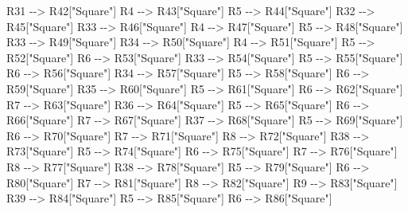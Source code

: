 \documentclass[
]{article}
\newenvironment{Shaded}{}{}
\newcommand{\NormalTok}[1]{#1}
\begin{document}
\begin{Shaded}
\begin{Highlighting}[]
\NormalTok{        R31 {-}{-}\textgreater{} R42["Square"]}
\NormalTok{        R4 {-}{-}\textgreater{} R43["Square"]}
\NormalTok{        R5 {-}{-}\textgreater{} R44["Square"]}
\NormalTok{        R32 {-}{-}\textgreater{} R45["Square"]}
\NormalTok{        R33 {-}{-}\textgreater{} R46["Square"]}
\NormalTok{        R4 {-}{-}\textgreater{} R47["Square"]}
\NormalTok{        R5 {-}{-}\textgreater{} R48["Square"]}
\NormalTok{        R33 {-}{-}\textgreater{} R49["Square"]}
\NormalTok{        R34 {-}{-}\textgreater{} R50["Square"]}
\NormalTok{        R4 {-}{-}\textgreater{} R51["Square"]}
\NormalTok{        R5 {-}{-}\textgreater{} R52["Square"]}
\NormalTok{        R6 {-}{-}\textgreater{} R53["Square"]}
\NormalTok{        R33 {-}{-}\textgreater{} R54["Square"]}
\NormalTok{        R5 {-}{-}\textgreater{} R55["Square"]}
\NormalTok{        R6 {-}{-}\textgreater{} R56["Square"]}
\NormalTok{        R34 {-}{-}\textgreater{} R57["Square"]}
\NormalTok{        R5 {-}{-}\textgreater{} R58["Square"]}
\NormalTok{        R6 {-}{-}\textgreater{} R59["Square"]}
\NormalTok{        R35 {-}{-}\textgreater{} R60["Square"]}
\NormalTok{        R5 {-}{-}\textgreater{} R61["Square"]}
\NormalTok{        R6 {-}{-}\textgreater{} R62["Square"]}
\NormalTok{        R7 {-}{-}\textgreater{} R63["Square"]}
\NormalTok{        R36 {-}{-}\textgreater{} R64["Square"]}
\NormalTok{        R5 {-}{-}\textgreater{} R65["Square"]}
\NormalTok{        R6 {-}{-}\textgreater{} R66["Square"]}
\NormalTok{        R7 {-}{-}\textgreater{} R67["Square"]}
\NormalTok{        R37 {-}{-}\textgreater{} R68["Square"]}
\NormalTok{        R5 {-}{-}\textgreater{} R69["Square"]}
\NormalTok{        R6 {-}{-}\textgreater{} R70["Square"]}
\NormalTok{        R7 {-}{-}\textgreater{} R71["Square"]}
\NormalTok{        R8 {-}{-}\textgreater{} R72["Square"]}
\NormalTok{        R38 {-}{-}\textgreater{} R73["Square"]}
\NormalTok{        R5 {-}{-}\textgreater{} R74["Square"]}
\NormalTok{        R6 {-}{-}\textgreater{} R75["Square"]}
\NormalTok{        R7 {-}{-}\textgreater{} R76["Square"]}
\NormalTok{        R8 {-}{-}\textgreater{} R77["Square"]}
\NormalTok{        R38 {-}{-}\textgreater{} R78["Square"]}
\NormalTok{        R5 {-}{-}\textgreater{} R79["Square"]}
\NormalTok{        R6 {-}{-}\textgreater{} R80["Square"]}
\NormalTok{        R7 {-}{-}\textgreater{} R81["Square"]}
\NormalTok{        R8 {-}{-}\textgreater{} R82["Square"]}
\NormalTok{        R9 {-}{-}\textgreater{} R83["Square"]}
\NormalTok{        R39 {-}{-}\textgreater{} R84["Square"]}
\NormalTok{        R5 {-}{-}\textgreater{} R85["Square"]}
\NormalTok{        R6 {-}{-}\textgreater{} R86["Square"]}

\end{Highlighting}
\end{Shaded}
\end{document}
